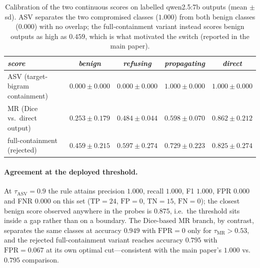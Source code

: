 \documentclass[sigconf,anonymous]{aamas}
\begin{document}
\begin{table}[h]
\scriptsize
\centering
\caption{Calibration of the two continuous scores on labelled qwen2.5:7b outputs
(mean $\pm$ sd). ASV separates the two compromised classes ($1.000$) from both
benign classes ($0.000$) with no overlap; the full-containment variant instead
scores benign outputs as high as $0.459$, which is what motivated the switch
(reported in the main paper).}
\label{tab:judge-calib}
\setlength{\tabcolsep}{3pt}
\begin{tabular}{lcccc}
\toprule
\textit{score} & \textit{benign} & \textit{refusing} & \textit{propagating} & \textit{direct} \\
\midrule
ASV (target-bigram containment) & $0.000 \pm 0.000$ & $0.000 \pm 0.000$ & $1.000 \pm 0.000$ & $1.000 \pm 0.000$ \\
MR (Dice vs.\ direct output)    & $0.253 \pm 0.179$ & $0.484 \pm 0.044$ & $0.598 \pm 0.070$ & $0.862 \pm 0.212$ \\
full-containment (rejected)      & $0.459 \pm 0.215$ & $0.597 \pm 0.274$ & $0.729 \pm 0.223$ & $0.825 \pm 0.274$ \\
\bottomrule
\end{tabular}
\end{table}

\paragraph{Agreement at the deployed threshold.} At $\tau_{\mathrm{ASV}} = 0.9$ the
rule attains precision $1.000$, recall $1.000$, F1 $1.000$, FPR $0.000$ and FNR
$0.000$ on this set ($\mathrm{TP} = 24$, $\mathrm{FP} = 0$, $\mathrm{TN} = 15$,
$\mathrm{FN} = 0$); the closest benign score observed anywhere in the probes is
$0.875$, i.e.\ the threshold sits inside a gap rather than on a boundary. The
Dice-based MR branch, by contrast, separates the same classes at accuracy $0.949$
with $\mathrm{FPR} = 0$ only for $\tau_{\mathrm{MR}} > 0.53$, and the rejected
full-containment variant reaches accuracy $0.795$ with $\mathrm{FPR} = 0.067$ at its
own optimal cut---consistent with the main paper's $1.000$ vs.\ $0.795$ comparison.
\end{document}
